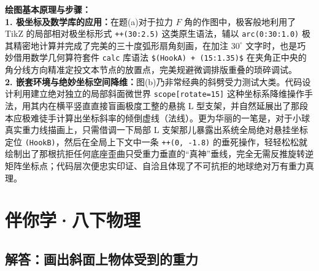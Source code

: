 \vspace{0.6cm}

{\small\color{blue!70!black}
\textbf{绘图基本原理与步骤：}\\
\textbf{1. 极坐标及数学库的应用：}在题(a)对于拉力 $F$ 角的作图中，极客般地利用了 TikZ 的局部相对极坐标形式 \texttt{++(30:2.5)} 这类原生语法，辅以 \texttt{arc(0:30:1.0)} 极其精密地计算并完成了完美的三十度弧形扇角刻画，在加注 $30^\circ$ 文字时，也是巧妙借用数学几何算符套件 \texttt{calc} 库语法 \texttt{\$(HookA) + (15:1.35)\$} 在夹角正中央的角分线方向精准定投文本节点的放置点，完美规避微调排版重叠的琐碎调试。\\
\textbf{2. 嵌套环境与绝妙坐标空间降维：}图(b)乃非常经典的斜劈受力测试大类。代码设计利用建立绝对独立的局部斜面微世界 \texttt{scope[rotate=15]} 这种坐标系降维操作手法，用其内在横平竖直直接盲画极度工整的悬挑 L 型支架，并自然延展出了那段本应极难徒手计算出坐标斜率的倾倒虚线（法线）。更为华丽的一笔是，对于小球真实重力线描画上，只需借调一下局部 L 支架那儿暴露出系统全局绝对悬挂坐标定位 \texttt{(HookB)}，然后在全局上下文中一条 \texttt{++(0, -1.8)} 的垂死操作，轻轻松松就绘制出了那根抗拒任何底座歪曲只受重力垂直的“真神”垂线，完全无需反推旋转逆矩阵坐标点；代码层次便忠实印证、自洽且体现了不可抗拒的地球绝对万有重力真理。
}


\chapter{伴你学·八下物理}



\section{解答：画出斜面上物体受到的重力}

\vspace{0.6cm}

